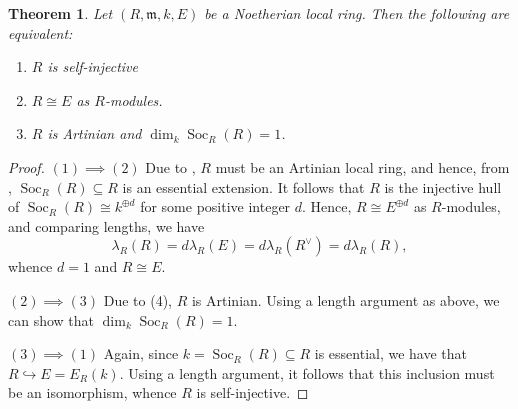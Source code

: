 \documentclass[10pt]{article}
\theoremstyle{thmstyle}
\newtheorem{theorem}{Theorem}[section]
\theoremstyle{defstyle}
\newcommand{\frakm}{\mathfrak{m}} %
\newcommand{\into}{\hookrightarrow}
\newcommand{\Soc}{\operatorname{Soc}}
\begin{document}
\begin{theorem}
    Let $(R,\frakm, k, E)$ be a Noetherian local ring. Then the following are equivalent: 
    \begin{enumerate}[label=(\arabic*)]
        \item $R$ is self-injective
        \item $R\cong E$ as $R$-modules. 
        \item $R$ is Artinian and $\dim_k\Soc_R(R) = 1$.
    \end{enumerate}
\end{theorem}
\begin{proof}
$(1)\implies(2)$ Due to , $R$ must be an Artinian local ring, and hence, from , $\Soc_R(R)\subseteq R$ is an essential extension. It follows that $R$ is the injective hull of $\Soc_R(R)\cong k^{\oplus d}$ for some positive integer $d$. Hence, $R\cong E^{\oplus d}$ as $R$-modules, and comparing lengths, we have 
\begin{equation*}
    \lambda_R(R) = d\lambda_R(E) = d\lambda_R(R^\vee) = d\lambda_R(R),
\end{equation*}
whence $d = 1$ and $R\cong E$. 

$(2)\implies(3)$ Due to  (4), $R$ is Artinian. Using a length argument as above, we can show that $\dim_k\Soc_R(R) = 1$. 

$(3)\implies(1)$ Again, since $k = \Soc_R(R)\subseteq R$ is essential, we have that $R\into E = E_R(k)$. Using a length argument, it follows that this inclusion must be an isomorphism, whence $R$ is self-injective.
\end{proof}

\end{document}
